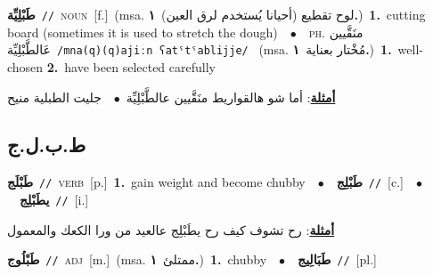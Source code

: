 \documentclass[10pt,a4paper,twoside]{article} %
\begin{document}
\begin{multicols}{2}
{\setlength\topsep{0pt}\textbf{\foreignlanguage{arabic}{طَبْلِيِّة}}\ {\color{gray}\texttt{//}\color{black}}\ \textsc{noun}\ [f.]\ \color{gray}(msa. \foreignlanguage{arabic}{لوح تقطيع (أحيانا يُستخدم لرق العين)}~\foreignlanguage{arabic}{\textbf{١.}})\color{black}\ \textbf{1.}~cutting board (sometimes it is used to stretch the dough)\ \ $\bullet$\ \ \textsc{ph.} \color{gray} \foreignlanguage{arabic}{منَقَّيين عَالطَّبْلِيِّة}\color{black}\ {\color{gray}\texttt{/{\sffamily mna(q)(q)ajiːn ʕatˤtˤablijje}/}\color{black}}\ \color{gray} (msa. \foreignlanguage{arabic}{مُخْتار بعناية}~\foreignlanguage{arabic}{\textbf{١.}})\color{black}\ \textbf{1.}~well-chosen  \textbf{2.}~have been selected carefully\  \begin{flushright}\color{gray}\foreignlanguage{arabic}{\textbf{\underline{\foreignlanguage{arabic}{أمثلة}}}: أما شو هالقواريط منَقَّيين عالطَّبْلِيِّة\ $\bullet$\ \  جليت الطبلية منيح}\end{flushright}\color{black}} \vspace{2mm}

\vspace{-3mm}
\subsection*{\color{blue}\foreignlanguage{arabic}{ط.ب.ل.ج}\color{blue}{}} 

{\setlength\topsep{0pt}\textbf{\foreignlanguage{arabic}{طَبْلَج}}\ {\color{gray}\texttt{//}\color{black}}\ \textsc{verb}\ [p.]\ \textbf{1.}~gain weight and become chubby\ \ $\bullet$\ \ \setlength\topsep{0pt}\textbf{\foreignlanguage{arabic}{طَبْلِج}}\ {\color{gray}\texttt{//}\color{black}}\ [c.]\ \ $\bullet$\ \ \setlength\topsep{0pt}\textbf{\foreignlanguage{arabic}{يطَبْلِج}}\ {\color{gray}\texttt{//}\color{black}}\ [i.]\  \begin{flushright}\color{gray}\foreignlanguage{arabic}{\textbf{\underline{\foreignlanguage{arabic}{أمثلة}}}: رح تشوف كيف رح يطَبْلِج عالعيد من ورا الكعك والمعمول}\end{flushright}\color{black}} \vspace{2mm}

{\setlength\topsep{0pt}\textbf{\foreignlanguage{arabic}{طَبْلُوج}}\ {\color{gray}\texttt{//}\color{black}}\ \textsc{adj}\ [m.]\ \color{gray}(msa. \foreignlanguage{arabic}{ممتلئ}~\foreignlanguage{arabic}{\textbf{١.}})\color{black}\ \textbf{1.}~chubby\ \ $\bullet$\ \ \setlength\topsep{0pt}\textbf{\foreignlanguage{arabic}{طَبَالِيج}}\ {\color{gray}\texttt{//}\color{black}}\ [pl.]\ } \vspace{2mm}


\end{multicols}
\end{document}
